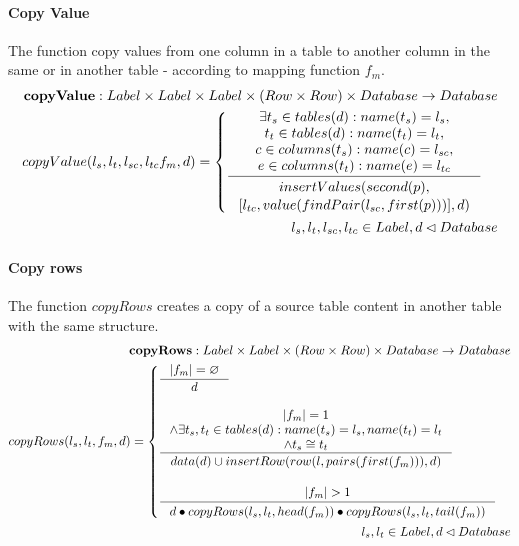 \documentclass[11pt]{article}
\begin{document}
\paragraph{Copy Value} The function copy values from one column in a table to another column in the same or in another table - according to mapping function $f_m$. 
\begin{align*}
	\mathbf{copyValue} : Label \times Label \times Label \times (Row \times Row) \times Database \rightarrow Database \\
	copyValue(l_s, l_t, l_{sc}, l_{tc} f_m, d) = \begin{cases}
		\inference{\exists t_s \in tables(d) : name(t_s) = l_s, \\ t_t \in tables(d) : name(t_t) = l_t, \\ c \in columns(t_s) : name(c) = l_{sc}, \\ e \in columns(t_t) : name(e) = l_{tc}}{\begin{gathered}
			insertValues(second(p), \\ [l_{tc},value(findPair(l_{sc}, first(p)))],d)
		\end{gathered}}
 	\end{cases} \\
 	l_s, l_t, l_{sc}, l_{tc} \in Label, d \lhd Database
\end{align*}

\paragraph{Copy rows} The function $copyRows$ creates a copy of a source table content in another table with the same structure. 
\begin{align*}
	\mathbf{copyRows} : Label \times Label \times (Row \times Row) \times Database \rightarrow Database \\
	copyRows(l_s, l_t, f_m, d) = \begin{cases}
 	\inference{|f_m| = \varnothing}{d} \\\\
 	\inference{|f_m| = 1 \\ \wedge \exists t_s, t_t \in tables(d) : name(t_s) = l_s, name(t_t) = l_t \\ \wedge t_s \cong t_t }{data(d) \cup insertRow(row(l, pairs(first(f_m))), d)} \\\\
 	\inference{|f_m| > 1}{\begin{gathered}
		 d \bullet copyRows(l_s, l_t, head(f_m)) \bullet copyRows(l_s, l_t, tail(f_m))
	\end{gathered}}
  \end{cases} \\
  l_s, l_t \in Label, d \lhd Database
\end{align*}
\end{document}
